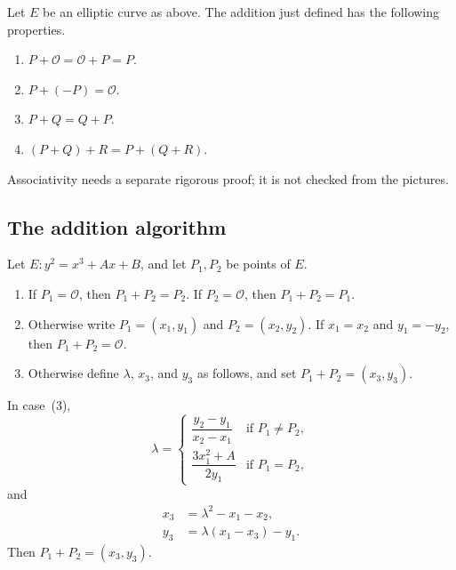 \begin{keybox}
\begin{theorem}
\label{thm:group-law}
Let $E$ be an elliptic curve as above. The addition just defined has the following properties.
\begin{enumerate}[leftmargin=1.6em,label=\textup{(\arabic*)}]
    \item $P+\mathcal{O}=\mathcal{O}+P=P$.
    \item $P+(-P)=\mathcal{O}$.
    \item $P+Q=Q+P$.
    \item $(P+Q)+R=P+(Q+R)$.
\end{enumerate}
Associativity needs a separate rigorous proof; it is not checked from the pictures.
\end{theorem}
\end{keybox}

\subsection{The addition algorithm}

Let $E\colon y^2=x^3+Ax+B$, and let $P_1,P_2$ be points of $E$.
\begin{enumerate}[leftmargin=1.6em,label=\textup{(\arabic*)}]
    \item If $P_1=\mathcal{O}$, then $P_1+P_2=P_2$. If $P_2=\mathcal{O}$, then $P_1+P_2=P_1$.
    \item Otherwise write $P_1=(x_1,y_1)$ and $P_2=(x_2,y_2)$. If $x_1=x_2$ and $y_1=-y_2$, then $P_1+P_2=\mathcal{O}$.
    \item Otherwise define $\lambda$, $x_3$, and $y_3$ as follows, and set $P_1+P_2=(x_3,y_3)$.
\end{enumerate}


In case~(3),
\begin{equation}
    \lambda=
    \begin{cases}
        \dfrac{y_2-y_1}{x_2-x_1} & \text{if }P_1\neq P_2,\\[1.1em]
        \dfrac{3x_1^2+A}{2y_1} & \text{if }P_1=P_2,
    \end{cases}
    \label{eq:lambda}
\end{equation}
and
\begin{align}
    x_3&=\lambda^2-x_1-x_2, \label{eq:x3}\\
    y_3&=\lambda(x_1-x_3)-y_1. \label{eq:y3}
\end{align}
Then $P_1+P_2=(x_3,y_3)$.

